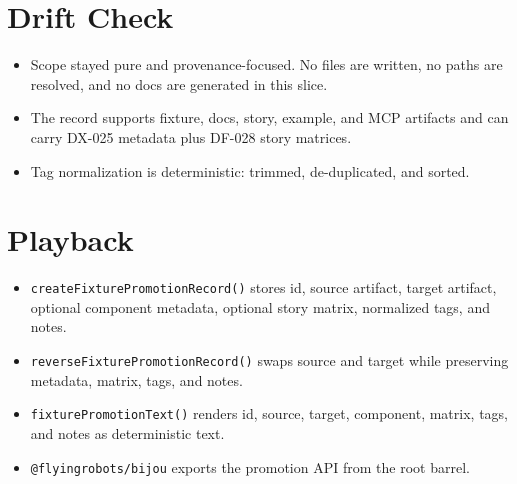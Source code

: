 \section{Drift Check}\label{record-090-drift-check}

\begin{itemize}
\tightlist
\item
  Scope stayed pure and provenance-focused. No files are written, no paths are resolved, and no docs are generated in this slice.
\item
  The record supports fixture, docs, story, example, and MCP artifacts and can carry DX-025 metadata plus DF-028 story matrices.
\item
  Tag normalization is deterministic: trimmed, de-duplicated, and sorted.
\end{itemize}

\section{Playback}\label{record-090-playback}

\begin{itemize}
\tightlist
\item
  \texttt{c\allowbreak{}r\allowbreak{}e\allowbreak{}a\allowbreak{}t\allowbreak{}e\allowbreak{}F\allowbreak{}i\allowbreak{}x\allowbreak{}t\allowbreak{}u\allowbreak{}r\allowbreak{}e\allowbreak{}P\allowbreak{}r\allowbreak{}o\allowbreak{}m\allowbreak{}o\allowbreak{}t\allowbreak{}i\allowbreak{}o\allowbreak{}n\allowbreak{}R\allowbreak{}e\allowbreak{}c\allowbreak{}o\allowbreak{}r\allowbreak{}d\allowbreak{}(\allowbreak{})} stores id, source artifact, target artifact, optional component metadata, optional story matrix, normalized tags, and notes.
\item
  \texttt{r\allowbreak{}e\allowbreak{}v\allowbreak{}e\allowbreak{}r\allowbreak{}s\allowbreak{}e\allowbreak{}F\allowbreak{}i\allowbreak{}x\allowbreak{}t\allowbreak{}u\allowbreak{}r\allowbreak{}e\allowbreak{}P\allowbreak{}r\allowbreak{}o\allowbreak{}m\allowbreak{}o\allowbreak{}t\allowbreak{}i\allowbreak{}o\allowbreak{}n\allowbreak{}R\allowbreak{}e\allowbreak{}c\allowbreak{}o\allowbreak{}r\allowbreak{}d\allowbreak{}(\allowbreak{})} swaps source and target while preserving metadata, matrix, tags, and notes.
\item
  \texttt{f\allowbreak{}i\allowbreak{}x\allowbreak{}t\allowbreak{}u\allowbreak{}r\allowbreak{}e\allowbreak{}P\allowbreak{}r\allowbreak{}o\allowbreak{}m\allowbreak{}o\allowbreak{}t\allowbreak{}i\allowbreak{}o\allowbreak{}n\allowbreak{}T\allowbreak{}e\allowbreak{}x\allowbreak{}t\allowbreak{}(\allowbreak{})} renders id, source, target, component, matrix, tags, and notes as deterministic text.
\item
  \texttt{@\allowbreak{}f\allowbreak{}l\allowbreak{}y\allowbreak{}i\allowbreak{}n\allowbreak{}g\allowbreak{}r\allowbreak{}o\allowbreak{}b\allowbreak{}o\allowbreak{}t\allowbreak{}s\allowbreak{}/\allowbreak{}b\allowbreak{}i\allowbreak{}j\allowbreak{}o\allowbreak{}u} exports the promotion API from the root barrel.
\end{itemize}

